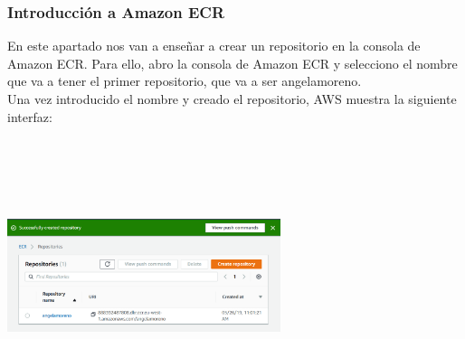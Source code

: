 \documentclass[english,runningheads,a4paper]{llncs}[2018/03/10]
\newenvironment{nscenter}
 {\parskip=0pt\par\nopagebreak\centering}
 {\par\noindent\ignorespacesafterend}
\begin{document}
\subsubsection*{Introducción a Amazon ECR}
En este apartado nos van a enseñar a crear un repositorio en la consola de 
Amazon ECR. Para ello, abro la consola de Amazon ECR y selecciono el nombre que 
va a tener el primer repositorio, que va a ser angelamoreno. \\
Una vez introducido el nombre y creado el repositorio, AWS muestra la siguiente 
interfaz:
\newline
\begin{nscenter}
\includegraphics[width=8cm,height=8cm,keepaspectratio]{./Contenedores/AWS/27.png}
\end{nscenter}
\end{document}
